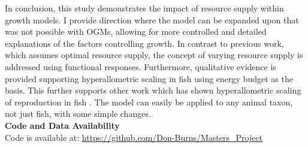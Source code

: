 \documentclass[a4paper, 11pt, hidelinks]{article} %
\begin{document}
	
	In conclusion, this study demonstrates the impact of resource supply within growth models.  I provide direction where the model can be expanded upon that was not possible with OGMs, allowing for more controlled and detailed explanations of the factors controlling growth.  In contrast to previous work, which assumes optimal resource supply, the concept of varying resource supply is addressed using functional responses.  Furthermore, qualitative evidence is provided supporting hyperallometric scaling in fish using energy budget as the basis. This further supports other work which has shown hyperallometric scaling of reproduction in fish \parencite{Barneche2018, Sadoul2020}.  The model can easily be applied to any animal taxon, not just fish, with some simple changes.  
	\\
	\textbf{Code and Data Availability}
	\\
	Code is available at: \url{https://github.com/Don-Burns/Masters_Project}
	
	
	
	\newpage
	
	
	\printbibliography[sorting=anyt]
	
	
	
	\newpage
	
	
	
\end{document}
